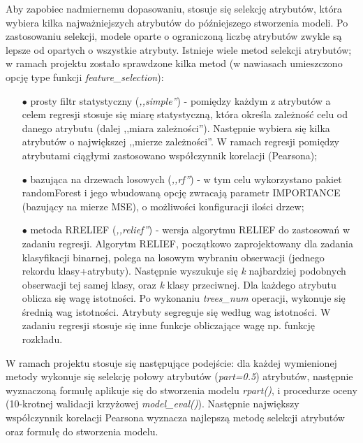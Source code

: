 \documentclass[a4paper,11pt,twoside]{mwrep}  %
\begin{document}
Aby zapobiec nadmiernemu dopasowaniu, stosuje się selekcję atrybutów, która wybiera kilka najważniejszych atrybutów do późniejszego stworzenia modeli. Po zastosowaniu selekcji, modele oparte o ograniczoną liczbę atrybutów zwykle są lepsze od opartych o wszystkie atrybuty. Istnieje wiele metod selekcji atrybutów; w ramach projektu zostało sprawdzone kilka metod (w nawiasach umieszczono opcję type funkcji \textit{feature\_selection}):
\begin{itemize}
	\item[$\bullet$] prosty filtr statystyczny (\textit{,,simple''}) - pomiędzy każdym z atrybutów a celem regresji stosuje się miarę statystyczną, która określa zależność celu od danego atrybutu (dalej ,,miara zależności''). Następnie wybiera się kilka atrybutów o największej ,,mierze zależności''. W ramach regresji pomiędzy atrybutami ciągłymi zastosowano współczynnik korelacji (Pearsona);
	\item[$\bullet$] bazująca na drzewach losowych (\textit{,,rf''}) - w tym celu wykorzystano pakiet randomForest i jego wbudowaną opcję zwracają parametr IMPORTANCE (bazujący na mierze MSE), o możliwości konfiguracji ilości drzew;
	\item[$\bullet$] metoda RRELIEF (\textit{,,relief''}) - wersja algorytmu RELIEF do zastosowań w zadaniu regresji. Algorytm RELIEF, początkowo zaprojektowany dla zadania klasyfikacji binarnej, polega na losowym wybraniu obserwacji (jednego rekordu klasy+atrybuty). Następnie wyszukuje się \textit{k} najbardziej podobnych obserwacji tej samej klasy, oraz \textit{k} klasy przeciwnej. Dla każdego atrybutu oblicza się wagę istotności. Po wykonaniu \textit{trees\_num} operacji, wykonuje się średnią wag istotności. Atrybuty segreguje się według wag istotności. W zadaniu regresji stosuje się inne funkcje obliczające wagę np. funkcję rozkładu.
\end{itemize}
	
\par
W ramach projektu stosuje się następujące podejście: dla każdej wymienionej metody wykonuje się selekcję połowy atrybutów (\textit{part=0.5}) atrybutów, następnie wyznaczoną formułę aplikuje się do stworzenia modelu \textit{rpart()}, i procedurze oceny (10-krotnej walidacji krzyżowej \textit{model\_eval()}). Następnie największy współczynnik korelacji Pearsona wyznacza najlepszą metodę selekcji atrybutów oraz formułę do stworzenia modelu.
\end{document}
